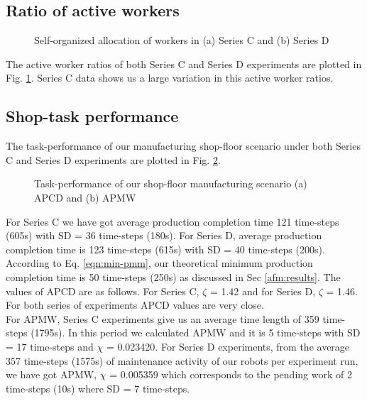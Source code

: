 \subsection*{Ratio of active workers}
\begin{figure}
\centering
\hspace*{0.5cm}
\newline
{}
\caption{\small Self-organized allocation of workers in (a) Series C and (b) Series D}
\label{fig:plasticity-SC-SD} 
\end{figure}
%
The active worker ratios of both Series C and Series D experiments are plotted in Fig. \ref{fig:plasticity-SC-SD}. Series C data shows us a large variation in this active worker ratios.
\subsection*{Shop-task performance}
The task-performance of our manufacturing shop-floor scenario under both Series C and Series D experiments are plotted in Fig. \ref{fig:vms-SC-SD}. 
\begin{figure}
\centering
\hspace*{0.5cm}
\newline
{}
\caption{\small Task-performance of our shop-floor manufacturing scenario (a) APCD and (b) APMW}
\label{fig:vms-SC-SD} 
\end{figure}
For Series C we have got average production completion time 121 time-steps (605s) with SD = 36 time-steps (180s). For Series D,  average production completion time is 123 time-steps (615s) with SD = 40 time-steps (200s). According to Eq. \ref{eqn:min-pmm}, our theoretical minimum production completion time is 50 time-steps (250s) as discussed in Sec \ref{afm:results}.  The values of APCD are as follows. For Series C, $\zeta$ = 1.42 and for Series D, $\zeta$ = 1.46. For both series of experiments APCD values are very close.\\
For APMW, Series C experiments give us an average time length of 359 time-steps (1795s). In this period we calculated APMW and it is 5 time-steps with SD = 17 time-steps and $\chi$ = 0.023420. For Series D experiments, from the average 357 time-steps (1575s) of maintenance activity of our robots per experiment run, we have got APMW, $\chi$ = 0.005359 which corresponds to the pending work of 2 time-steps (10s) where SD = 7 time-steps.
